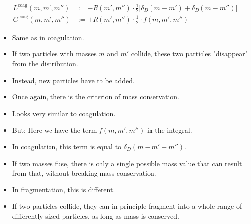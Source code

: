    \begin{align}
        L^\text{coag}(m, m', m'') 
            &:= -R(m',m'') \cdot \frac{1}{2} \bigg[\delta_D(m-m')+\delta_D(m-m'')\bigg] \\
        G^\text{coag}(m, m', m'') 
            &:= +R(m',m'') \cdot \frac{1}{2} \cdot f(m,m',m'')
    \end{align}

    \begin{itemize}
        \item Same as in coagulation.
        \item If two particles with masses $m$ and $m'$ collide, these two particles "disappear"
              from the distribution.
        \item Instead, new particles have to be added.
        \item Once again, there is the criterion of mass conservation.
    \end{itemize}

    \begin{itemize}
        \item Looks very similar to coagulation.
        \item But: Here we have the term $f(m,m',m'')$ in the integral.
        \item In coagulation, this term is equal to $\delta_D(m-m'-m'')$.
        \item If two masses fuse, there is only a single possible mass value that can result from 
              that, without breaking mass conservation.
        \item In fragmentation, this is different.
        \item If two particles collide, they can in principle fragment into a whole range of 
              differently sized particles, as long as mass is conserved.
    \end{itemize}

     \\
     \\

     \\
     \\

